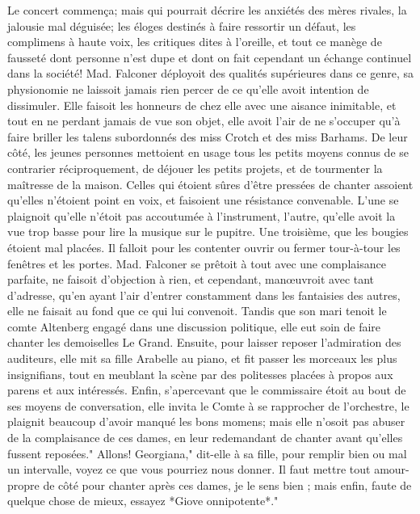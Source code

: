 Le concert commença; mais qui pourrait décrire les anxiétés des mères rivales, la jalousie mal déguisée; les éloges destinés à faire ressortir un défaut, les complimens à haute voix, les critiques dites à l'oreille, et tout ce manège de fausseté dont personne n'est dupe et dont on fait cependant un échange continuel dans la société!
Mad. Falconer déployoit des qualités supérieures dans ce genre, sa physionomie ne laissoit jamais rien percer de ce qu'elle avoit intention de dissimuler. Elle faisoit les honneurs de chez elle avec une aisance inimitable, et tout en ne perdant jamais de vue son objet, elle avoit l'air de ne s'occuper qu'à faire briller les talens subordonnés des miss Crotch et des miss Barhams.
De leur côté, les jeunes personnes mettoient en usage tous les petits moyens connus de se contrarier réciproquement, de déjouer les petits projets, et de tourmenter la maîtresse de la maison. Celles qui étoient sûres d'être pressées de chanter assoient qu'elles n'étoient point en voix, et faisoient une résistance convenable. L'une se plaignoit qu'elle n'étoit pas accoutumée à l'instrument, l'autre,\setcounter{page}{117} qu'elle avoit la vue trop basse pour lire la musique sur le pupitre. Une troisième, que les bougies étoient mal placées. Il falloit pour les contenter ouvrir ou fermer tour-à-tour les fenêtres et les portes. Mad. Falconer se prêtoit à tout avec une complaisance parfaite, ne faisoit d'objection à rien, et cependant, manœuvroit avec tant d'adresse, qu'en ayant l'air d'entrer constamment dans les fantaisies des autres, elle ne faisait au fond que ce qui lui convenoit. Tandis que son mari tenoit le comte Altenberg engagé dans une discussion politique, elle eut soin de faire chanter les demoiselles Le Grand. Ensuite, pour laisser reposer l'admiration des auditeurs, elle mit sa fille Arabelle au piano, et fit passer les morceaux les plus insignifians, tout en meublant la scène par des politesses placées à propos aux parens et aux intéressés. Enfin, s'apercevant que le commissaire étoit au bout de ses moyens de conversation, elle invita le Comte à se rapprocher de l'orchestre, le plaignit beaucoup d'avoir manqué les bons momens; mais elle n'osoit pas abuser de la complaisance de ces dames, en leur redemandant de chanter avant qu'elles fussent reposées." Allons! Georgiana," dit-elle à sa fille, pour remplir bien ou mal\setcounter{page}{118} un intervalle, voyez ce que vous pourriez nous donner. Il faut mettre tout amour-propre de côté pour chanter après ces dames, je le sens bien ; mais enfin, faute de quelque chose de mieux, essayez *Giove onnipotente*."
